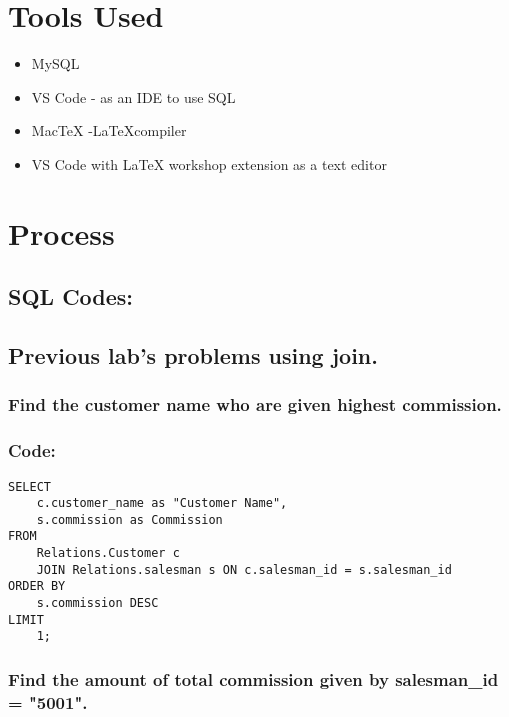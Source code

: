 \documentclass[12pt]{article}
\title{}
\author{}
\date{}
\begin{document}

\pagebreak

\tableofcontents

\maketitle

\section{Tools Used}
\begin{itemize}
    \item MySQL
    \item VS Code - as an IDE to use SQL
    \item MacTeX -\LaTeX  compiler
    \item VS Code with LaTeX workshop extension as a text editor
\end{itemize}


\section{Process}


\subsection*{SQL Codes:}
\subsection{Previous lab's problems using join.}
\subsubsection{Find the customer name who are given highest commission.}
\subsubsection*{Code:}
\begin{verbatim}
SELECT
    c.customer_name as "Customer Name",
    s.commission as Commission
FROM
    Relations.Customer c
    JOIN Relations.salesman s ON c.salesman_id = s.salesman_id
ORDER BY
    s.commission DESC
LIMIT
    1;
\end{verbatim}
\vspace{10mm}

\subsubsection{Find the amount of total commission given by salesman\_id = "5001".}
\end{document}
